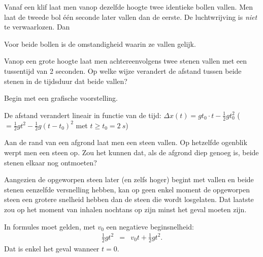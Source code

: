 \documentclass{ximera}
\begin{document}
\begin{exercise}
	Vanaf een klif laat men vanop dezelfde hoogte twee identieke bollen vallen. Men laat de tweede bol \'e\'en seconde later vallen dan de eerste. De luchtwrijving is \textit{niet} te verwaarlozen. Dan
	\begin{multipleChoice}
	\end{multipleChoice}
	\begin{oplossing}
		Voor beide bollen is de omstandigheid waarin ze vallen gelijk.
	\end{oplossing}
\end{exercise}

\begin{exercise}
	Vanop een grote hoogte laat men achtereenvolgens twee stenen vallen met een tussentijd van 2 seconden. Op welke wijze verandert de afstand tussen beide stenen in de tijdsduur dat beide vallen?
	\begin{hint}
		Begin met een grafische voorstelling.
	\end{hint}
	\begin{oplossing}
		De afstand verandert lineair in functie van de tijd: $\Delta x(t)=gt_0\cdot t-\frac{1}{2}gt_0^2$ ($=\frac{1}{2}gt^2-\frac{1}{2}g(t-t_0)^2$ met $t\geq t_0=\SI{2}{s}$)
	\end{oplossing}
\end{exercise}

\begin{exercise}
	Aan de rand van een afgrond laat men een steen vallen. Op hetzelfde ogenblik werpt men een steen op. Zou het kunnen dat, als de afgrond diep genoeg is, beide stenen elkaar nog ontmoeten?

	\begin{oplossing}
		Aangezien de opgeworpen steen later (en zelfs hoger) begint met vallen en beide stenen eenzelfde versnelling hebben, kan op geen enkel moment de opgeworpen steen een grotere snelheid hebben dan de steen die wordt losgelaten. Dat laatste zou op het moment van inhalen nochtans op zijn minst het geval moeten zijn.

		In formules moet gelden, met $v_0$ een negatieve beginsnelheid:
		\begin{eqnarray*}
			\frac{1}{2}gt^2&=&v_0t+\frac{1}{2}gt^2.
		\end{eqnarray*}
		Dat is enkel het geval wanneer $t=0$.
	\end{oplossing}
\end{exercise}
\end{document}
